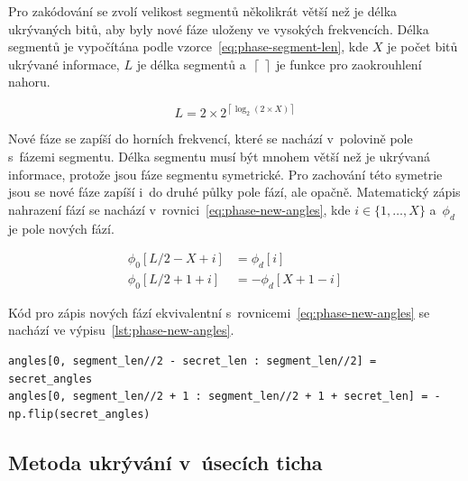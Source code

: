 Pro zakódování se zvolí velikost segmentů několikrát větší než je délka
ukrývaných bitů, aby byly nové fáze uloženy ve vysokých frekvencích. Délka
segmentů je vypočítána podle vzorce~\ref{eq:phase-segment-len}, kde $X$ je
počet bitů ukrývané informace, $L$ je délka segmentů
a~$\left\lceil~\right\rceil$ je funkce pro zaokrouhlení nahoru.

\begin{equation}
    \label{eq:phase-segment-len}
    L = 2 \times 2^{\left\lceil \log_2{(2 \times X)} \right\rceil}
\end{equation}

\noindent Nové fáze se zapíší do horních frekvencí, které se nachází v~polovině
pole s~fázemi segmentu. Délka segmentu musí být mnohem větší než je ukrývaná
informace, protože jsou fáze segmentu symetrické. Pro zachování této symetrie
jsou se nové fáze zapíší i~do druhé půlky pole fází, ale opačně. Matematický
zápis nahrazení fází se nachází v~rovnici~\ref{eq:phase-new-angles}, kde $i \in
\{ 1, \dots, X \}$ a~$\phi_d$ je pole nových fází.

\begin{equation}
    \begin{aligned}
        \label{eq:phase-new-angles}
        \phi_0[L/2 - X + i] &= \phi_d[i] \\
        \phi_0[L/2 + 1 + i] &= -\phi_d[X + 1 - i]
    \end{aligned}
\end{equation}

\noindent Kód pro zápis nových fází ekvivalentní
s~rovnicemi~\ref{eq:phase-new-angles} se nachází ve
výpisu~\ref{lst:phase-new-angles}.

\begin{lstlisting}[language=PythonPlus, label={lst:phase-new-angles},
caption={Zápis nových fází do pole s~fázemi segmentu.}]
angles[0, segment_len//2 - secret_len : segment_len//2] = secret_angles
angles[0, segment_len//2 + 1 : segment_len//2 + 1 + secret_len] = -np.flip(secret_angles)
\end{lstlisting}

\subsection*{Metoda ukrývání v~úsecích ticha}
\label{sub:hiding-in-silence-intervals-implementation}

